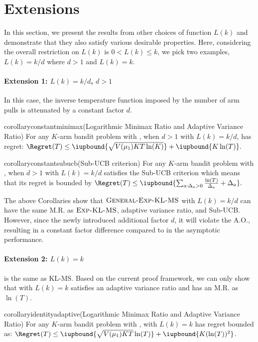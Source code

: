 \section{Extensions}
In this section, we present the results from other choices of function $L(k)$ and demonstrate that they also satisfy various desirable properties. Here, considering the overall restriction on $L(k)$ is $0 < L(k) \leq k$, we pick two examples, $L(k) = k/d$ where $d > 1$ and $L(k) = k$.

\paragraph{Extension 1: $L(k) = k/d$, $d > 1$} 
In this case, the inverse temperature function 
imposed by the number of arm pulls is attenuated by a constant factor $d$.

\begin{restatable}{corollary}{constantminimax}\textnormal{(Logarithmic Minimax Ratio and Adaptive Variance Ratio)} \label{corol:exp-kl-ms-half-mo}
    For any $K$-arm bandit problem with , when $d>1$ \gexpklms with $L(k) = k/d$, has regret:
    $
        \Regret(T) \leq \iupbound{\sqrt{V(\mu_1) KT \ln(K)}} + \iupbound{K\ln(T)}.
    $
\end{restatable}
\begin{restatable}{corollary}{constantsubucb}\textnormal{(Sub-UCB criterion)} \label{corol:exp-kl-ms-half-sub-ucb}
    For any $K$-arm bandit problem with , when $d>1$ \gexpklms with $L(k) = k/d$ satisfies the Sub-UCB criterion which means that its regret is bounded by 
    $
        \Regret(T) \leq \iupbound{\textstyle\sum_{a: \Delta_a > 0} \frac{\ln(T)}{\Delta_a} + \Delta_a}.
    $
\end{restatable}
The above Corollaries show that $\textsc{General-Exp-KL-MS}$ with $L(k)=k/d$ can have the same M.R. as $\textsc{Exp-KL-MS}$, adaptive variance ratio, and Sub-UCB. However, since the newly introduced additional factor $d$, it will violate the A.O., resulting in a constant factor difference compared to \expklms in the asymptotic performance.

\paragraph{Extension 2: $L(k) = k$} \gexpklms is the same as KL-MS. Based on the current proof framework, we can only show that \gexpklms with $L(k) = k$ satisfies an adaptive variance ratio and has an M.R. as $\ln(T)$.

\begin{restatable}{corollary}{identityadaptive}\textnormal{(Logarithmic Minimax Ratio and Adaptive Variance Ratio)} \label{corol:exp-kl-ms-one-mo}
For any $K$-arm bandit problem with , \gexpklms with $L(k) = k$ has regret bounded as:
    $
        \Regret(T) \leq \iupbound{\sqrt{V(\mu_1) KT}\ln(T)} + \iupbound{ K (\ln(T))^2 }
    $.
\end{restatable}
